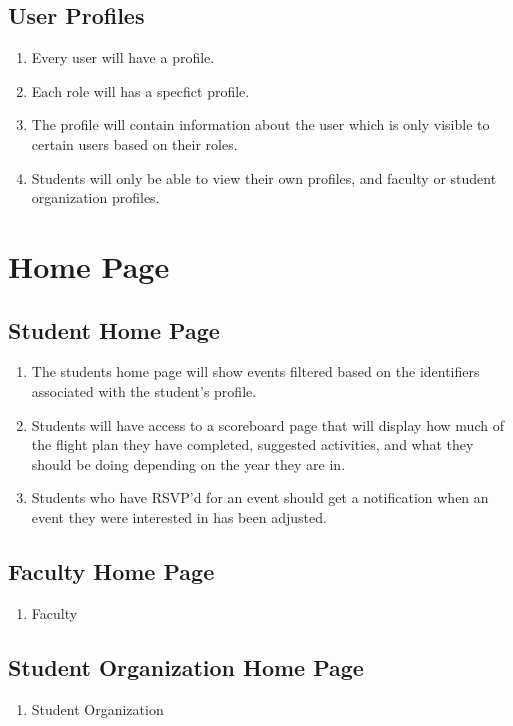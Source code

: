 \documentclass{article}
\begin{document}
	\subsection{User Profiles}
		\begin{enumerate}[leftmargin=3\parindent]
			\item Every user will have a profile.
			\item Each role will has a specfict profile.
			\item The profile will contain information about the user which is only visible to certain users based on their roles.
			\item Students will only be able to view their own profiles, and faculty or student organization profiles.
		\end{enumerate}
\section{Home Page}
		\subsection{Student Home Page}
			\begin{enumerate}[leftmargin=3\parindent]
				\item The students home page will show events filtered based on the identifiers associated with the student’s profile.
				\item Students will have access to a scoreboard page that will display how much of the flight plan they have completed, suggested activities, and what they should be doing depending on the year they are in.
				\item Students who have RSVP’d for an event should get a notification when an event they were interested in has been adjusted.
			\end{enumerate}
		\subsection{Faculty Home Page}
			\begin{enumerate}[leftmargin=3\parindent]
				\item Faculty 
			\end{enumerate}
		\subsection{Student Organization Home Page}
			\begin{enumerate}[leftmargin=3\parindent]
				\item Student Organization
			\end{enumerate}
\end{document}

